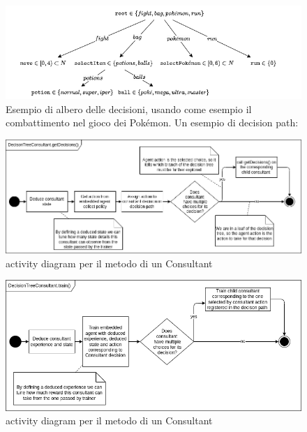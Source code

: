 \documentclass[conference]{IEEEtran}
\begin{document}
\begin{figure}
    \centering
    \includegraphics[width=\textwidth]{figs/decisions.drawio.png}
    \caption{Esempio di albero delle decisioni, usando come esempio il combattimento
    nel gioco dei Pokémon. Un esempio di decision path:\\
    }
    \label{fig:decisions}
\end{figure}
\begin{figure}
    \centering
    \includegraphics[width=\textwidth]{figs/decisions_getDecisions_activity_diagram.drawio.png}
    \caption{activity diagram per il metodo  di un Consultant}
    \label{fig:decisions_getDecisions_activity_diagram}
\end{figure}
\begin{figure}
    \centering
    \includegraphics[width=\textwidth]{figs/decisions_train_activity_diagram.drawio.png}
    \caption{activity diagram per il metodo  di un Consultant}
    \label{fig:decisions_train_activity_diagram}
\end{figure}
\end{document}
